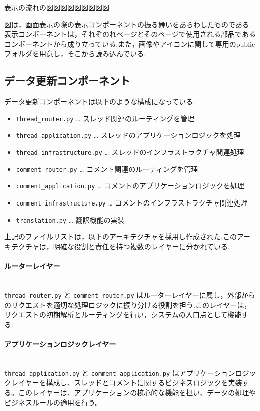 \documentclass[b5paper,12pt]{jsreport}
\begin{document}
表示の流れの図図図図図図図図図

図は，画面表示の際の表示コンポーネントの振る舞いをあらわしたものである.表示コンポーネントは，それぞのれページとそのページで使用される部品であるコンポーネントから成り立っている.また，画像やアイコンに関して専用のpublicフォルダを用意し，そこから読み込んでいる.

\subsection*{データ更新コンポーネント}

データ更新コンポーネントは以下のような構成になっている.

\begin{itemize}
    \item \texttt{thread\_router.py} … スレッド関連のルーティングを管理
    \item \texttt{thread\_application.py} … スレッドのアプリケーションロジックを処理
    \item \texttt{thread\_infrastructure.py} … スレッドのインフラストラクチャ関連処理
    \item \texttt{comment\_router.py} … コメント関連のルーティングを管理
    \item \texttt{comment\_application.py} … コメントのアプリケーションロジックを処理
    \item \texttt{comment\_infrastructure.py} … コメントのインフラストラクチャ関連処理
    \item \texttt{translation.py} … 翻訳機能の実装
\end{itemize}

上記のファイルリストは，以下のアーキテクチャを採用し作成された.このアーキテクチャは，明確な役割と責任を持つ複数のレイヤーに分かれている.

\paragraph{ルーターレイヤー}\mbox{}\\
\texttt{thread\_router.py} と \texttt{comment\_router.py} はルーターレイヤーに属し，外部からのリクエストを適切な処理ロジックに振り分ける役割を担う.このレイヤーは，リクエストの初期解析とルーティングを行い，システムの入口点として機能する.

\paragraph{アプリケーションロジックレイヤー}\mbox{}\\
\texttt{thread\_application.py} と \texttt{comment\_application.py} はアプリケーションロジックレイヤーを構成し、スレッドとコメントに関するビジネスロジックを実装する。このレイヤーは、アプリケーションの核心的な機能を担い、データの処理やビジネスルールの適用を行う。
\end{document}
